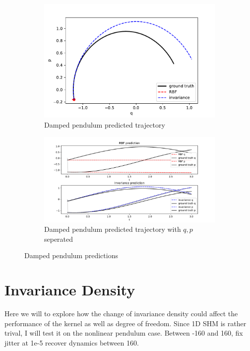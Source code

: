\documentclass{statsmsc}
\begin{document}
\begin{figure}[H]
     \centering
     \begin{subfigure}[b]{\linewidth}
        \centering
        \includegraphics[width=\linewidth]{../codes/figures/damped_pendulum_predicted_trajectory.pdf}
        \caption{Damped pendulum predicted trajectory}
        \label{fig:damped_pendulum_prediction_combined}
     \end{subfigure}
     \hfill
     \begin{subfigure}[b]{\linewidth}
         \centering
         \includegraphics[width=\linewidth]{../codes/figures/damped_pendulum_predicted_trajectory_seperate.pdf}
         \caption{Damped pendulum predicted trajectory with $q, p$ seperated}
         \label{fig:damped_pendulum_prediction_seperate}
     \end{subfigure}
        \caption{Damped pendulum predictions}
        \label{fig:damped_pendulum_prediction}
\end{figure}

\section{Invariance Density}
Here we will to explore how the change of invariance density could affect the performance of the kernel as well as degree of freedom.
Since 1D SHM is rather trival, I will test it on the nonlinear pendulum case. 
Between -160 and 160, fix jitter at 1e-5
recover dynamics between 160.
\end{document}
